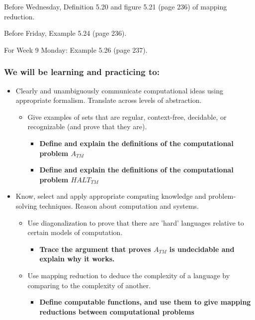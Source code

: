 Before Wednesday, Definition 5.20 and figure 5.21 (page 236) of mapping reduction.

Before Friday, Example 5.24 (page 236).

For Week 9 Monday: Example 5.26 (page 237).

\vspace{-20pt}

\subsubsection*{We will be learning and practicing to:}

\vspace{-20pt}

\begin{itemize}
    \item Clearly and unambiguously communicate computational ideas using appropriate formalism. Translate across levels of abstraction.
    \begin{itemize}
        \item Give examples of sets that are regular, context-free, decidable, or recognizable (and prove that they are).
        \begin{itemize}
          \item {\bf Define and explain the definitions of the computational problem $A_{TM}$}
          \item {\bf Define and explain the definitions of the computational problem $HALT_{TM}$}
       \end{itemize}
    \end{itemize}
    \item Know, select and apply appropriate computing knowledge and problem-solving techniques. Reason about computation and systems.
    \begin{itemize}
        \item Use diagonalization to prove that there are 'hard' languages relative to certain models of computation.
        \begin{itemize}
            \item {\bf Trace the argument that proves $A_{TM}$ is undecidable and explain why it works.}
        \end{itemize}
        \item Use mapping reduction to deduce the complexity of a language by comparing to the complexity of another.
           \begin{itemize}
              \item {\bf Define computable functions, and use them to give mapping reductions between computational problems}

\end{itemize}
\end{itemize}
\end{itemize}
